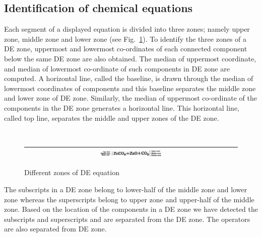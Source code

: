 \documentclass[conference]{IEEEtran}
\begin{document}
\subsection{Identification of chemical equations} Each segment
of a displayed equation is divided into three zones; namely
upper zone, middle zone and lower zone (see
Fig.~\ref{sub_super}). To identify the three zones of a DE zone,
uppermost and lowermost co-ordinates of each connected component
below the same DE zone are also obtained. The median of
uppermost coordinate, and median of lowermost co-ordinate of
such components in DE zone are computed. A horizontal line,
called the baseline, is drawn through the median of lowermost
coordinates of components and this baseline separates the middle
zone and lower zone of DE zone. Similarly, the median of
uppermost co-ordinate of the components in the DE zone generates
a horizontal line. This horizontal line, called top line,
separates the middle and upper zones of the DE zone.

\begin{figure}[h]
\center\ 
\begin{tabular}{|c|} 
\hline
\includegraphics[width=0.3\textwidth]{supSub.png}\\
\hline
\end{tabular} 
\caption{Different zones of DE equation}
\label{sub_super} 
\end{figure} 
The subscripts in a DE zone
belong to lower-half of the middle zone and lower zone whereas
the superscripts belong to upper zone and upper-half of the
middle zone. Based on the location of the components in a DE
zone we have detected the subscripts and superscripts and are
separated from the DE zone. The operators are also separated
from DE zone.
 
\end{document}
